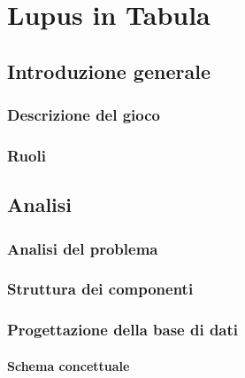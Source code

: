 \documentclass[10pt,twoside,cucitura]{toptesi}
\begin{document}
\frontespizio

\sommario


\indici

\mainmatter

\part{Lupus in Tabula}
\label{part:part1}

\chapter{Introduzione generale}

\section{Descrizione del gioco}


\section{Ruoli}


\chapter{Analisi}

\section{Analisi del problema}


\section{Struttura dei componenti}


\section{Progettazione della base di dati}


\subsection{Schema concettuale}

\end{document}

